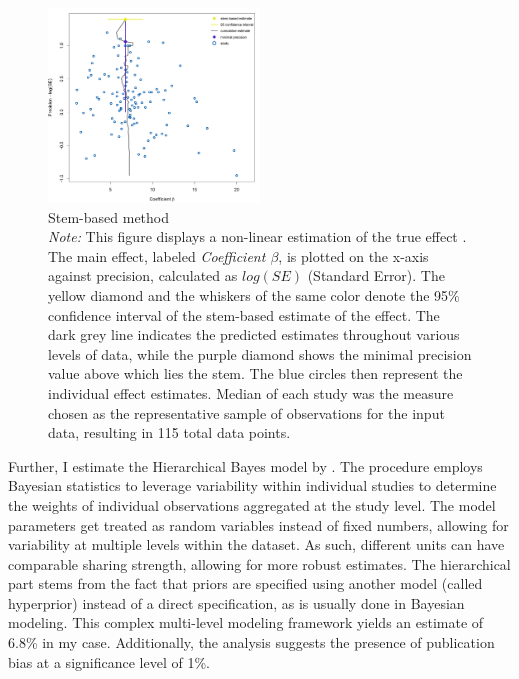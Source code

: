 \begin{figure}
  \centering
  \captionsetup{font = scriptsize}
  \caption[Stem-based method]{\vspace{0.5cm}Stem-based method\\ \emph{Note:} This figure displays a non-linear estimation of the true effect \citep{Furukawa2019Stem}. The main effect, labeled \textit{Coefficient $\beta$}, is plotted on the x-axis against precision, calculated as $log(SE)$ (Standard Error). The yellow diamond and the whiskers of the same color denote the 95\% confidence interval of the stem-based estimate of the effect. The dark grey line indicates the predicted estimates throughout various levels of data, while the purple diamond shows the minimal precision value above which lies the stem. The blue circles then represent the individual effect estimates. Median of each study was the measure chosen as the representative sample of observations for the input data, resulting in 115 total data points.}
  \label{fig:stem}
  \includegraphics[width=0.5\textwidth]{Figures/stem.png}
\end{figure}

Further, I estimate the Hierarchical Bayes model by \cite{Allenby2006Hier}. The procedure employs Bayesian statistics to leverage variability within individual studies to determine the weights of individual observations aggregated at the study level. The model parameters get treated as random variables instead of fixed numbers, allowing for variability at multiple levels within the dataset. As such, different units can have comparable sharing strength, allowing for more robust estimates. The hierarchical part stems from the fact that priors are specified using another model (called hyperprior) instead of a direct specification, as is usually done in Bayesian modeling. This complex multi-level modeling framework yields an estimate of 6.8\% in my case. Additionally, the analysis suggests the presence of publication bias at a significance level of 1\%.

